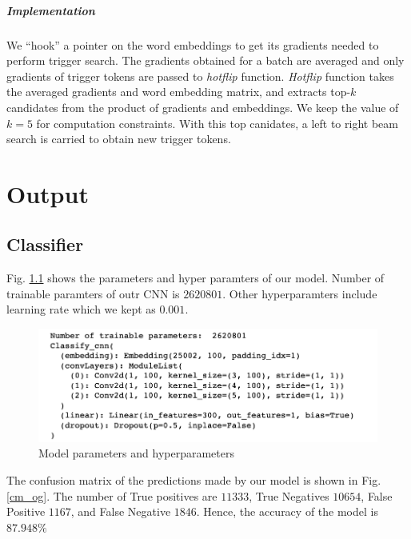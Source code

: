 \documentclass[12pt]{report}
\begin{document}
\begin{spacing}{1.5}
\paragraph{Implementation}
We ``hook'' a pointer on the word embeddings to get its gradients needed to perform trigger search. The gradients obtained for a batch are averaged and only gradients of trigger tokens are passed to \textit{hotflip} function.
\textit{Hotflip} function takes the averaged gradients and word embedding matrix, and extracts top-$k$ candidates from the product of gradients and embeddings. We keep the value of $k = 5$ for computation constraints. With this top canidates, a left to right beam search is carried to obtain new trigger tokens.

\chapter{Output}
\section{Classifier}
Fig. \ref{model_param} shows the parameters and hyper paramters of our model. Number of trainable paramters of outr CNN is $2620801$. Other hyperparamters include learning rate which we kept as $0.001$.

\begin{figure}[!h]
  \centering
  \includegraphics[width=0.6\linewidth]{./img/output/model_param.png}
  \caption{Model parameters and hyperparameters}
  \label{model_param}
\end{figure}

The confusion matrix of the predictions made by our model is shown in Fig. \ref{cm_og}. The number of True positives are $11333$, True Negatives $10654$, False Positive $1167$, and False Negative $1846$. Hence, the accuracy of the model is $87.948\%$


\end{spacing}
\end{document}
